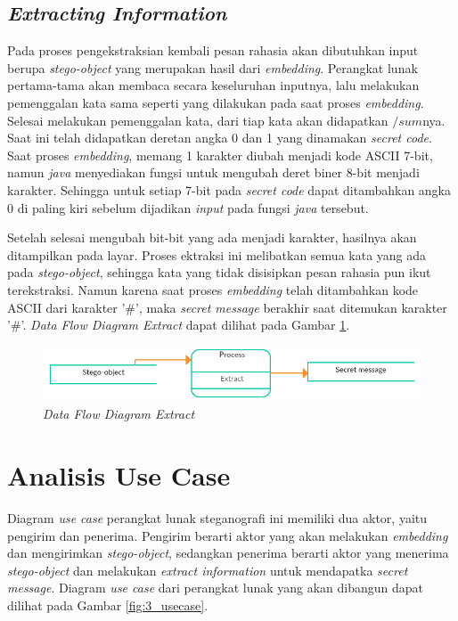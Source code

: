 \subsection{\textit{Extracting Information}}
Pada proses pengekstraksian kembali pesan rahasia akan dibutuhkan input berupa \textit{stego-object} yang merupakan hasil dari \textit{embedding}. Perangkat lunak pertama-tama akan membaca secara keseluruhan inputnya, lalu melakukan pemenggalan kata sama seperti yang dilakukan pada saat proses \textit{embedding}. Selesai melakukan pemenggalan kata, dari tiap kata akan didapatkan $/sum$nya. Saat ini telah didapatkan deretan angka 0 dan 1 yang dinamakan \textit{secret code}. Saat proses \textit{embedding}, memang 1 karakter diubah menjadi kode ASCII 7-bit, namun \textit{java} menyediakan fungsi untuk mengubah deret biner 8-bit menjadi karakter. Sehingga untuk setiap 7-bit pada \textit{secret code} dapat ditambahkan angka 0 di paling kiri sebelum dijadikan \textit{input} pada fungsi \textit{java} tersebut.

Setelah selesai mengubah bit-bit yang ada menjadi karakter, hasilnya akan ditampilkan pada layar. Proses ektraksi ini melibatkan semua kata yang ada pada \textit{stego-object}, sehingga kata yang tidak disisipkan pesan rahasia pun ikut terekstraksi. Namun karena saat proses \textit{embedding} telah ditambahkan kode ASCII dari karakter '\#', maka \textit{secret message} berakhir saat ditemukan karakter '\#'. \textit{Data Flow Diagram Extract} dapat dilihat pada Gambar \ref{fig:5-dfd-extract}.

\begin{figure}[H]
	\centering
	\includegraphics[scale=0.8]{Gambar/dfd-extract}
	\caption{\textit{Data Flow Diagram Extract}} 
	\label{fig:5-dfd-extract}
\end{figure}

\section{Analisis Use Case}

Diagram \textit{use case} perangkat lunak steganografi ini memiliki dua aktor, yaitu pengirim dan penerima. Pengirim berarti aktor yang akan melakukan \textit{embedding} dan mengirimkan \textit{stego-object}, sedangkan penerima berarti aktor yang menerima \textit{stego-object} dan melakukan \textit{extract information} untuk mendapatka \textit{secret message}. Diagram \textit{use case} dari perangkat lunak yang akan dibangun dapat dilihat pada Gambar \ref{fig:3_usecase}.

